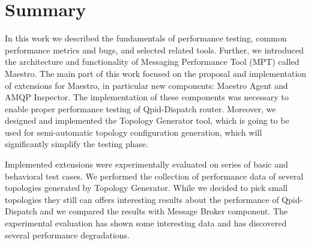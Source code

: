 
\chapter{Summary}
\label{Summary}
In this work we described the fundamentals of performance testing, common performance metrics and bugs, and selected related tools. Further, we introduced the architecture and functionality of Messaging Performance Tool (MPT) called Maestro. The main part of this work focused on the proposal and implementation of extensions for Maestro, in particular new components: Maestro Agent and AMQP Inspector. The implementation of these components was necessary to enable proper performance testing of Qpid-Dispatch router. Moreover, we designed and implemented the Topology Generator tool, which is going to be used for semi-automatic topology configuration generation, which will significantly simplify the testing phase.

%

Implemented extensions were experimentally evaluated on series of basic and behavioral test cases. We performed the collection of performance data of several topologies generated by Topology Generator. While we decided to pick small topologies they still can offers interesting results about the performance of Qpid-Dispatch and we compared the results with Message Broker component. The experimental evaluation has shown some interesting data and has discovered several performance degradations.

